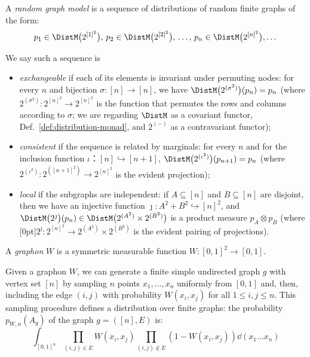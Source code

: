 \begin{definition}[e.g.~{\cite[\S11.2.1]{MR3012035}}]\label{def:rgm}
  A \emph{random graph model} is a sequence of distributions of random finite graphs of the form:
\begin{equation*}
  p_1\in \DistM\big(2^{[1]^2}\big),\,
  p_2\in \DistM\big(2^{[2]^2}\big),\,
  \dots,\, 
  p_n\in \DistM\big(2^{[n]^2}\big),
  \dots 
\end{equation*}

We say such a sequence is
\begin{itemize}
\item \emph{exchangeable} if each of its elements is invariant under permuting nodes:
  for every $n$ and bijection $\sigma \colon [n]\to [n]$, we have 
  $\DistM\big(2^{(\sigma^2)}\big)(p_n)=p_n$ (where
  $2^{(\sigma^2)}: 2^{[n]^2}\to 2^{[n]^2}$ is the function that
  permutes the rows and columns according to $\sigma$;
  we are regarding $\DistM$ as a covariant functor, Def.~\ref{def:distribution-monad}, and $2^{(-)}$ as a contravariant functor);
\item \emph{consistent} if the sequence is related by marginals:
  for every $n$ and for the inclusion function $\iota：[n] ↪ [n+1]$,
  $\DistM\big(2^{(\iota^2)}\big)(p_{n+1})=p_n$ (where
  $2^{(\iota^2)}:2^{([n+1]^2)}\to 2^{[n]^2}$ is the evident projection);
\item \emph{local} if the subgraphs are independent:
  if $A \subseteq [n]$ and $B \subseteq [n]$ are disjoint,
  then we have an injective function ${\jmath\colon A^2 + B^2\hookrightarrow [n]^2}$, and
  $\DistM\big(2^{\jmath}\big)(p_{n})\in \DistM\big(2^{(A^2)}\times 2^{(B^2)}\big)$
  is a product measure $p_A\otimes p_B$
(where \raisebox{0pt}[0pt]{$2^{\jmath}:2^{[n]^2}\to 2^{(A^2)}\times 2^{(B^2)}$} is
the evident pairing of projections).

\end{itemize}
\end{definition}

 \begin{definition}[e.g.~\cite{MR3012035}]
        A \emph{graphon} $W$ is a symmetric measurable function $W : [0,1]^2 \to [0,1]$.
\end{definition}
\newcommand{\graphonrgm}[3]{p_{#1,#2}(A_{#3})}
Given a graphon $W$, we can generate a finite simple undirected graph
$g$ with vertex set $[n]$ by sampling $n$ points $x_1, \ldots, x_n$
uniformly from $[0,1]$ and, then, including the edge $(i, j)$ with
probability $W(x_i, x_j)$ for all $1 ≤ i, j ≤ n$. This sampling
procedure defines a distribution over finite graphs: the probability
$\graphonrgm W n g$ of the graph $g = ([n], E)$ is:
%
\begin{equation}\int_{[0,1]^n} 
\!\prod_{(i,j) ∈ E} \!\!\! W(x_i, x_j) 
\prod_{(i,j) ∉ E} \!\!\!\! \left(1 - W(x_i, x_j) \right)
\dd(x_1\ldots x_n)\label{eqn:pwg}\end{equation}

